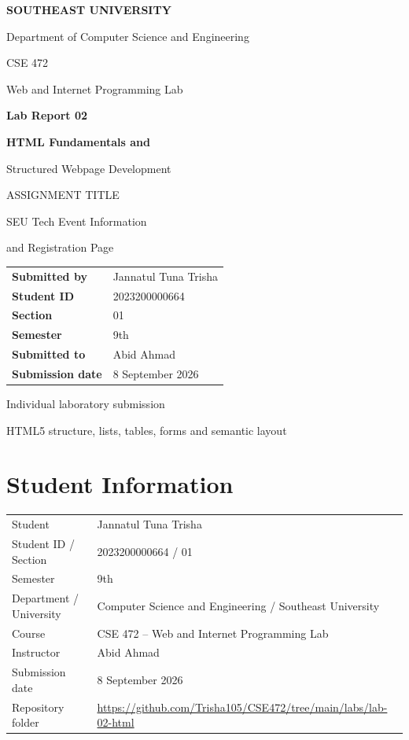 \documentclass[11pt,a4paper]{article}
\begin{document}
\begin{titlepage}
\centering
{\Large\bfseries\color{navy}SOUTHEAST UNIVERSITY\par}
\vspace{8pt}
{\large Department of Computer Science and Engineering\par}
\vspace{26pt}
{\large CSE 472\par Web and Internet Programming Lab\par}
\vspace{34pt}
{\fontsize{30}{36}\selectfont\bfseries\color{navy}Lab Report 02\par}
\vspace{14pt}
{\LARGE\bfseries HTML Fundamentals and\par Structured Webpage Development\par}
\vspace{20pt}
{\small\color{muted}ASSIGNMENT TITLE\par}
\vspace{5pt}
{\large SEU Tech Event Information\par and Registration Page\par}
\vspace{32pt}
\begin{tabular}{@{}ll@{}}
\textbf{Submitted by} & Jannatul Tuna Trisha \\[8pt]
\textbf{Student ID} & 2023200000664 \\[8pt]
\textbf{Section} & 01 \\[8pt]
\textbf{Semester} & 9th \\[8pt]
\textbf{Submitted to} & Abid Ahmad \\[8pt]
\textbf{Submission date} & 8 September 2026 \\
\end{tabular}
\vfill
{\small\color{muted}Individual laboratory submission\par}
{\small\color{muted}HTML5 structure, lists, tables, forms and semantic layout\par}
\end{titlepage}
\setcounter{page}{2}

\section{Student Information}
\begin{tabularx}{\linewidth}{@{}L{36mm}Y@{}}
\toprule
Student & Jannatul Tuna Trisha \\
Student ID / Section & 2023200000664 / 01 \\
Semester & 9th \\
Department / University & Computer Science and Engineering / Southeast University \\
Course & CSE 472 -- Web and Internet Programming Lab \\
Instructor & Abid Ahmad \\
Submission date & 8 September 2026 \\
Repository folder & \url{https://github.com/Trisha105/CSE472/tree/main/labs/lab-02-html} \\
\bottomrule
\end{tabularx}
\end{document}
